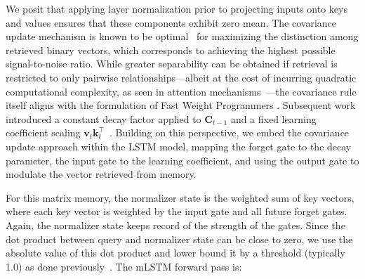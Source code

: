 We posit that applying layer normalization prior to projecting inputs onto keys and values ensures that these components exhibit zero mean. The covariance update mechanism is known to be optimal~\citep{Dayan:91} for maximizing the distinction among retrieved binary vectors, which corresponds to achieving the highest possible signal-to-noise ratio. While greater separability can be obtained if retrieval is restricted to only pairwise relationships—albeit at the cost of incurring quadratic computational complexity, as seen in attention mechanisms~\citep{Krotov:16,Krotov:17,Ramsauer:21}—the covariance rule itself aligns with the formulation of Fast Weight Programmers \citep{Schmidhuber:92ncfastweights,Schlag:21}. Subsequent work introduced a constant decay factor applied to $\mathbf{C}_{t-1}$ and a fixed learning coefficient scaling 
$\mathbf{v}_{t} \mathbf{k}_t ^\top$~\citep{Ba:16}. Building on this perspective, we embed the covariance update approach within the LSTM model, mapping the forget gate to the decay parameter, the input gate to the learning coefficient, and using the output gate to modulate the vector retrieved from memory.

For this matrix memory, the normalizer state is the weighted sum of key vectors, where each key vector is weighted by the input gate and all future forget gates. Again, the normalizer state keeps record of the strength of the gates. Since the dot product between query and normalizer state can be close to zero, we use the absolute value of this dot product and lower bound it by a threshold (typically 1.0) as done previously~\citep{Sun:23arxiv}. The mLSTM forward pass is:

